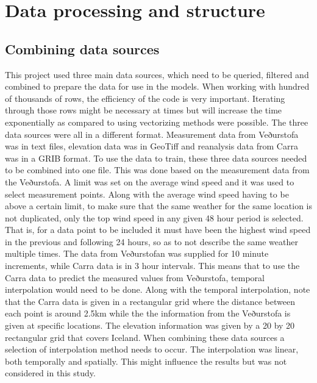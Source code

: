 \chapter{Data processing and structure} %

\label{Chapter3} %


\section{Combining data sources}

This project used three main data sources, which need to be queried, filtered and combined to prepare the data for use in the models. When working with hundred of thousands of rows, the efficiency of the code is very important. Iterating through those rows might be necessary at times but will increase the time exponentially as compared to using vectorizing methods were possible. The three data sources were all in a different format. Measurement data from Veðurstofa was in text files, elevation data was in GeoTiff and reanalysis data from Carra was in a GRIB format. To use the data to train, these three data sources needed to be combined into one file. This was done based on the measurement data from the Veðurstofa. A limit was set on the average wind speed and it was used to select measurement points. Along with the average wind speed having to be above a certain limit, to make sure that the same weather for the same location is not duplicated, only the top wind speed in any given 48 hour period is selected. That is, for a data point to be included it must have been the highest wind speed in the previous and following 24 hours, so as to not describe the same weather multiple times. The data from Veðurstofan was supplied for 10 minute increments, while Carra data is in 3 hour intervals. This means that to use the Carra data to predict the measured values from Veðurstofa, temporal interpolation would need to be done. Along with the temporal interpolation, note that the Carra data is given in a rectangular grid where the distance between each point is around 2.5km while the the information from the Veðurstofa is given at specific locations. The elevation information was given by a 20 by 20 rectangular grid that covers Iceland. When combining these data sources a selection of interpolation method needs to occur. The interpolation was linear, both temporally and spatially. This might influence the results but was not considered in this study.

